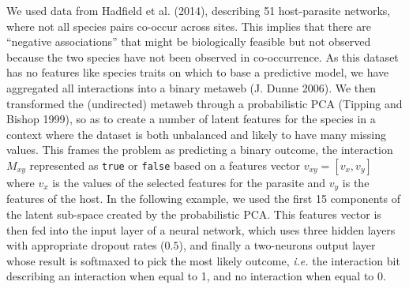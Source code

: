 \documentclass[10pt,oneside]{article}
\begin{document}
We used data from Hadfield et al. (2014), describing 51 host-parasite
networks, where not all species pairs co-occur across sites. This
implies that there are ``negative associations'' that might be
biologically feasible but not observed because the two species have not
been observed in co-occurrence. As this dataset has no features like
species traits on which to base a predictive model, we have aggregated
all interactions into a binary metaweb (J. Dunne 2006). We then
transformed the (undirected) metaweb through a probabilistic PCA
(Tipping and Bishop 1999), so as to create a number of latent features
for the species in a context where the dataset is both unbalanced and
likely to have many missing values. This frames the problem as
predicting a binary outcome, the interaction \(M_{xy}\) represented as
\texttt{true} or \texttt{false} based on a features vector
\(v_{xy} = [v_x, v_y]\) where \(v_x\) is the values of the selected
features for the parasite and \(v_y\) is the features of the host. In
the following example, we used the first 15 components of the latent
sub-space created by the probabilistic PCA. This features vector is then
fed into the input layer of a neural network, which uses three hidden
layers with appropriate dropout rates (\(0.5\)), and finally a
two-neurons output layer whose result is softmaxed to pick the most
likely outcome, \emph{i.e.} the interaction bit describing an
interaction when equal to 1, and no interaction when equal to 0.
\end{document}
